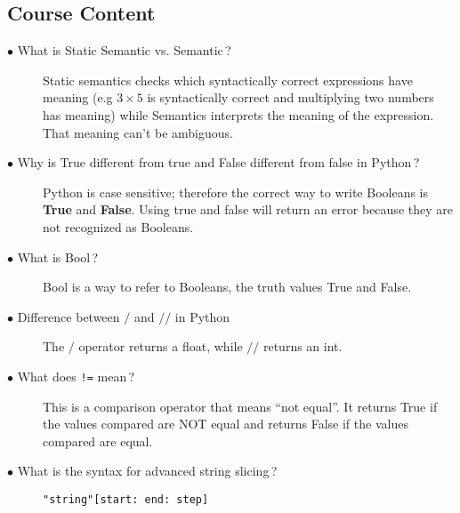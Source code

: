\documentclass{article}
\newcommand{\inlinecode}[1]{\texttt{#1}}
\newcommand{\question}[1]{\item[$\bullet$ #1] \hfil}
\newenvironment{answer}{}{}
\newenvironment{faq}{\begin{description}}{\end{description}}
\begin{document}
		\subsection*{\LARGE Course Content}
		
			\begin{faq}
				
				\question{What is Static Semantic vs. Semantic\,?}
				
				\begin{answer}
					Static semantics checks which syntactically correct expressions have
					meaning (e.g $3 \times 5$ is syntactically correct and multiplying two numbers has
					meaning) while Semantics interprets the meaning of the expression. That
					meaning can't be ambiguous.
				\end{answer}
				
				\question{Why is True different from true and False different from false in Python\,?}
				
				\begin{answer}
					Python is case sensitive; therefore the correct way to write Booleans is \textbf{True}
					and \textbf{False}. Using true and false will return an error because they are not
					recognized as Booleans.
				\end{answer}
				
				\question{What is Bool\,?}
				
				\begin{answer}
					Bool is a way to refer to Booleans, the truth values True and False.
				\end{answer}
				
				\question{Difference between $/$ and $//$ in Python}
				
				\begin{answer}
					The $/$ operator returns a float, while $//$ returns an int.
				\end{answer}
				
				\question{What does \inlinecode{!=} mean\,?}
				
				\begin{answer}
					This is a comparison operator that means ``not equal''. It returns True if the
					values compared are NOT equal and returns False if the values compared
					are equal.
				\end{answer}
				
				\question{What is the syntax for advanced string slicing\,?}
				
				\begin{answer}
					\inlinecode{"string"[start: end: step]}
				\end{answer}
				

\end{faq}
\end{document}
